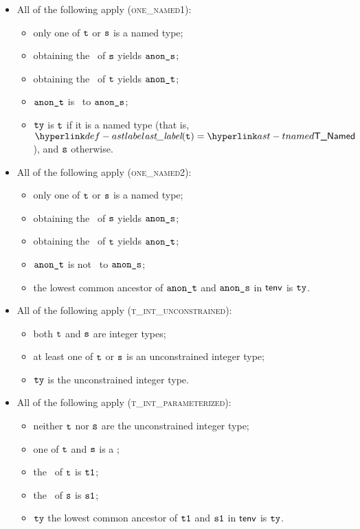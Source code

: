 \begin{itemize}
\begin{itemize}
    \item All of the following apply (\textsc{one\_named1}):
    \begin{itemize}
      \item only one of $\texttt{t}$ or $\texttt{s}$ is a named type;
      \item obtaining the \underlyingtype\ of $\texttt{s}$ yields $\texttt{anon\_s}$\ProseOrTypeError;
      \item obtaining the \underlyingtype\ of $\texttt{t}$ yields $\texttt{anon\_t}$\ProseOrTypeError;
      \item $\texttt{anon\_t}$ is \typeequal\ to $\texttt{anon\_s}$;
      \item $\texttt{ty}$ is $\texttt{t}$ if it is a named type (that is, $\astlabel(\vt)=\TNamed$), and $\texttt{s}$ otherwise.
    \end{itemize}

    \item All of the following apply (\textsc{one\_named2}):
    \begin{itemize}
      \item only one of $\texttt{t}$ or $\texttt{s}$ is a named type;
      \item obtaining the \underlyingtype\ of $\texttt{s}$ yields $\texttt{anon\_s}$\ProseOrTypeError;
      \item obtaining the \underlyingtype\ of $\texttt{t}$ yields $\texttt{anon\_t}$\ProseOrTypeError;
      \item $\texttt{anon\_t}$ is not \typeequal\ to $\texttt{anon\_s}$;
      \item the lowest common ancestor of $\texttt{anon\_t}$ and $\texttt{anon\_s}$ in $\textsf{tenv}$ is $\texttt{ty}$\ProseOrTypeError.
    \end{itemize}

    \item All of the following apply (\textsc{t\_int\_unconstrained}):
    \begin{itemize}
      \item both $\texttt{t}$ and $\texttt{s}$ are integer types;
      \item at least one of $\texttt{t}$ or $\texttt{s}$ is an unconstrained integer type;
      \item $\texttt{ty}$ is the unconstrained integer type.
    \end{itemize}

    \item All of the following apply (\textsc{t\_int\_parameterized}):
    \begin{itemize}
      \item neither $\texttt{t}$ nor $\texttt{s}$ are the unconstrained integer type;
      \item one of $\texttt{t}$ and $\texttt{s}$ is a \parameterizedintegertype;
      \item the \wellconstrainedversion\ of $\texttt{t}$ is $\texttt{t1}$;
      \item the \wellconstrainedversion\ of $\texttt{s}$ is $\texttt{s1}$;
      \item $\texttt{ty}$ the lowest common ancestor of $\texttt{t1}$ and $\texttt{s1}$ in $\textsf{tenv}$ is $\texttt{ty}$\ProseOrTypeError.
    \end{itemize}


\end{itemize}
\end{itemize}
